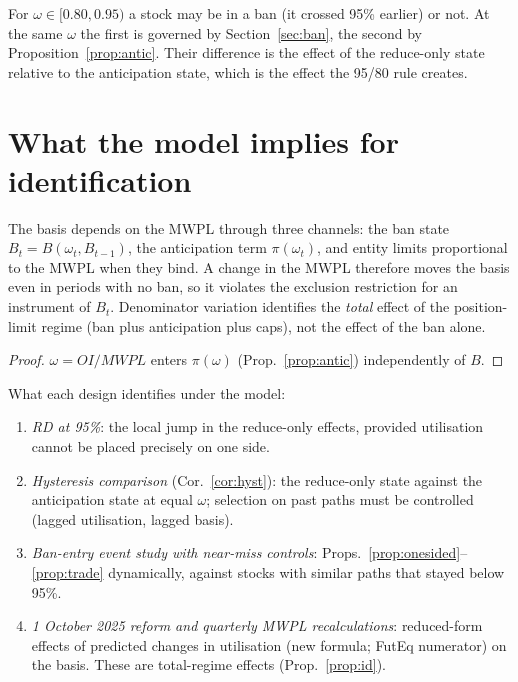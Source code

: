 \begin{corollary}[Hysteresis]\label{cor:hyst}
For $\omega\in[0.80,0.95)$ a stock may be in a ban (it crossed 95\% earlier) or not. At the same $\omega$ the first is
governed by Section~\ref{sec:ban}, the second by Proposition~\ref{prop:antic}. Their difference is the effect of the
reduce-only state relative to the anticipation state, which is the effect the 95/80 rule creates.
\end{corollary}

\section{What the model implies for identification}\label{sec:id}
\begin{proposition}\label{prop:id}
The basis depends on the MWPL through three channels: the ban state $B_t=B(\omega_t,B_{t-1})$, the anticipation term
$\pi(\omega_t)$, and entity limits proportional to the MWPL when they bind. A change in the MWPL therefore moves the
basis even in periods with no ban, so it violates the exclusion restriction for an instrument of $B_t$. Denominator
variation identifies the \emph{total} effect of the position-limit regime (ban plus anticipation plus caps), not the effect
of the ban alone.
\end{proposition}
\begin{proof}
$\omega=OI/MWPL$ enters $\pi(\omega)$ (Prop.~\ref{prop:antic}) independently of $B$.
\end{proof}

What each design identifies under the model:
\begin{enumerate}[leftmargin=1.6em,itemsep=1pt]
\item \emph{RD at 95\%}: the local jump in the reduce-only effects, provided utilisation cannot be placed precisely on one side.
\item \emph{Hysteresis comparison} (Cor.~\ref{cor:hyst}): the reduce-only state against the anticipation state at equal $\omega$;
selection on past paths must be controlled (lagged utilisation, lagged basis).
\item \emph{Ban-entry event study with near-miss controls}: Props.~\ref{prop:onesided}--\ref{prop:trade} dynamically, against
stocks with similar paths that stayed below 95\%.
\item \emph{1 October 2025 reform and quarterly MWPL recalculations}: reduced-form effects of predicted changes in utilisation
(new formula; FutEq numerator) on the basis. These are total-regime effects (Prop.~\ref{prop:id}).
\end{enumerate}

